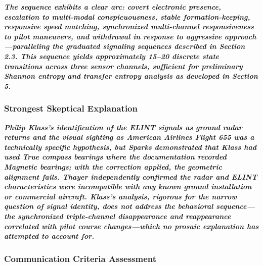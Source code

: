 \documentclass[11pt,letterpaper]{article}
\begin{document}
\textbf{\textit{The sequence exhibits a clear arc: covert electronic presence, escalation to multi-modal conspicuousness, stable formation-keeping, responsive speed matching, synchronized multi-channel responsiveness to pilot maneuvers, and withdrawal in response to aggressive approach---paralleling the graduated signaling sequences described in Section 2.3. This sequence yields approximately 15--20 discrete state transitions across three sensor channels, sufficient for preliminary Shannon entropy and transfer entropy analysis as developed in Section 5.}}


\subsubsection{Strongest Skeptical Explanation}

\textbf{\textit{Philip Klass's identification of the ELINT signals as ground radar returns and the visual sighting as American Airlines Flight 655 was a technically specific hypothesis, but Sparks demonstrated that Klass had used True compass bearings where the documentation recorded Magnetic bearings; with the correction applied, the geometric alignment fails. Thayer independently confirmed the radar and ELINT characteristics were incompatible with any known ground installation or commercial aircraft. Klass's analysis, rigorous for the narrow question of signal identity, does not address the behavioral sequence---the synchronized triple-channel disappearance and reappearance correlated with pilot course changes---which no prosaic explanation has attempted to account for.}}


\subsubsection{Communication Criteria Assessment}
\end{document}
